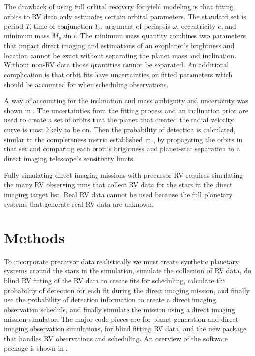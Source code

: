 The drawback of using full orbital recovery for yield modeling is that fitting
orbits to RV data only estimates certain orbital parameters. The standard set
is period $T$, time of conjunction $T_c$, argument of periapsis $\omega$,
eccentricity $e$, and minimum mass $M_p \sin{i}$. The minimum mass quantity
combines two parameters that impact direct imaging and estimations of an
exoplanet's brightness and location cannot be exact without separating the
planet mass and inclination. Without non-RV data those quantities cannot be
separated. An additional complication is that orbit fits have uncertainties on
fitted parameters which should be accounted for when scheduling observations.

A way of accounting for the inclination and mass ambiguity and uncertainty was
shown in . The uncertainties from the fitting
process and an inclination prior are used to create a set of orbits that the
planet that created the radial velocity curve is most likely to be on. Then the
probability of detection is calculated, similar to the completeness metric
established in \citet{Brown2005d}, by propagating the orbits in that set and
comparing each orbit's brightness and planet-star separation to a direct
imaging telescope's sensitivity limits.

Fully simulating direct imaging missions with precursor RV requires simulating
the many RV observing runs that collect RV data for the stars in the direct
imaging target list. Real RV data cannot be used because the full planetary
systems that generate real RV data are unknown.

\section{Methods}
To incorporate precursor data realistically we must create synthetic planetary
systems around the stars in the simulation, simulate the collection of RV data,
do blind RV fitting of the RV data to create fits for scheduling, calculate the
probability of detection for each fit during the direct imaging mission, and
finally use the probability of detection information to create a direct imaging
observation schedule, and finally simulate the mission using a direct imaging
mission simulator. The major code pieces are  for planet generation and
direct imaging observation simulations,  for blind fitting RV data, and
the new package  that handles RV observations and scheduling. An
overview of the software package is shown in .

